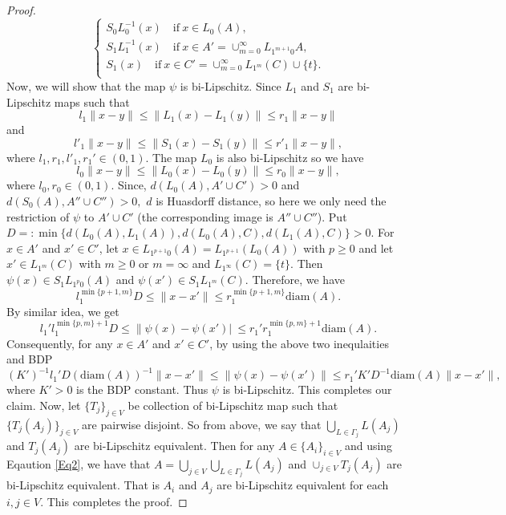 \documentclass[a4paper,12pt,reqno]{amsart}
\numberwithin{equation}{section}
\theoremstyle{definition}
\theoremstyle{remark}
\numberwithin{equation}{section}
\begin{document}
\begin{proof}
\begin{equation*}
\begin{cases}
S_0L_0^{-1}(x)  \quad \text{if}~x \in L_0(A),\\
 S_1L_1^{-1}(x)  \quad \text{if}~x \in A'=\cup_{m=0}^\infty L_{1^{m+1}0}A,\\
S_1(x)  \quad \text{if}~x \in C'=\cup_{m=0}^\infty L_{1^m}(C) \cup \{t\}.\\
\end{cases}
\end{equation*}
Now, we will show that the map $\psi$ is bi-Lipschitz. Since $L_1$ and $S_1$ are bi-Lipschitz maps such that  $$l_1\|x-y\|\leq \|L_1(x)-L_1(y)\|\leq r_1\|x-y\|$$ and $$l'_1\|x-y\|\leq \|S_1(x)-S_1(y)\|\leq r'_1\|x-y\|,$$ where $l_1, r_1,l'_1,r_1' \in (0,1).$
The map $L_0$ is also bi-Lipschitz so we have $$l_0\|x-y\|\leq \|L_0(x)-L_0(y)\|\leq r_0\|x-y\|,$$ where $l_0, r_0 \in (0,1).$
Since, $d(L_0 (A), A'\cup C')>0$ and $d(S_0 (A), A'' \cup C'')>0,$ $d$ is Huasdorff distance, so here we only need the restriction of $\psi$ to $A' \cup C'$ (the corresponding image is $A'' \cup C''$). Put $D=:\min \{d(L_0(A), L_1(A)), d(L_0(A), C), d(L_1(A), C)\}>0.$ For $x \in A'$ and $x' \in C'$, let $x \in L_{1^{p+1}0} (A)=L_{1^{p+1}}(L_0 (A))$ with $p \ge 0$ and let $x' \in L_{1^m} (C)$
 with $m \ge 0$ or $m=\infty$ and $L_{1^\infty} (C)=\{t\}.$  Then $\psi (x) \in S_1 L_{1^{p}0} (A)$ and $\psi (x') \in S_1 L_{1^m} (C).$
 Therefore, we have 
 $$ l_1^{\min \{p+1,m\}} D\le \|x-x'\| \le r_1^{\min \{p+1,m\}} \text{diam} (A).$$
 By similar idea, we get $$l_1'l_1^{\min \{p,m\}+1} D\le \|\psi(x)-\psi(x')|\  \le r_1' r_1^{\min \{p,m\}+1} \text{diam} (A).$$
 Consequently, for any $x \in A'$ and $x' \in C'$, by using the above two inequlaities and BDP 
 $$  (K')^{-1}l_1' D (\text{diam}(A))^{-1} \|x-x'\| \le\|\psi(x)-\psi(x')\| \le r_1' K' D^{-1} \text{diam}(A) \|x-x'\|,$$ where $K'>0$ is the BDP constant. Thus $\psi$ is bi-Lipschitz. This completes our claim.
 Now, let $\{T_j\}_{ j \in V}$ be collection of bi-Lipschitz map such that $\{T_j (A_j)\}_{j \in V}$ are pairwise disjoint. So from above, we say that $ \bigcup_{L \in \Gamma_j } L (A_j)$ and $T_j (A_j)$ are bi-Lipschitz equivalent. Then for any $A \in \{A_i\}_{i \in V}$ and using Eqaution \ref{Eq2}, we have that $A=\bigcup_{j \in V} \bigcup_{L \in \Gamma_j } L (A_j)$  and $\cup_{j \in V}T_j (A_j)$ are bi-Lipschitz equivalent. That is $A_i$ and $A_j$ are bi-Lipschitz equivalent for each $i,j \in V.$ This completes the proof.
 \end{proof}

	
	
\end{document}
